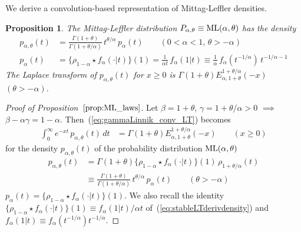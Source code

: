 \documentclass[a4paper,12pt]{article}
\newtheorem{proposition}{Proposition}
\begin{document}
{{We derive a convolution-based representation of Mittag-Leffler densities.
\begin{proposition}
\label{prop:ML_laws}
The Mittag-Leffler distribution $P_{\alpha,\theta} \equiv{\rm ML}(\alpha,\theta)$  has the   density %
\begin{align}
p_{\alpha,\theta}(t) &= \frac{\Gamma(1+\theta)}{\Gamma(1+\theta/\alpha)} \,  t^{\theta/\alpha} \, p_\alpha(t) 
\qquad (0<\alpha<1,\, \theta>-\alpha)
 \label{eq:ML2parconv_density} \\
 p_\alpha(t) &=  \{\rho_{1-\alpha}\star f_\alpha(\cdot\vert t) \}(1) = \frac{1}{\alpha t} \, f_\alpha(1\vert t)
   \equiv   \frac{1}{\alpha} \,  f_\alpha(t^{-1/\alpha}) \, t^{-1/\alpha-1}
\label{ML1parconv_density} 
\end{align}
The Laplace transform of $p_{\alpha,\theta}(t)$ for $x\ge0$  is 
$\Gamma(1+\theta)E^{1+\theta/\alpha}_{\alpha,1+\theta}(-x)$ $(\theta>-\alpha)$. 
\end{proposition}

\begin{proof}[Proof of Proposition~$\ref{prop:ML_laws}$]
\label{proof:ML_laws}
Let $\beta=1+\theta$, $\gamma=1+\theta/\alpha>0$  %
$\implies$  $\beta-\alpha\gamma=1-\alpha$.
Then~(\ref{eq:gammaLinnik_conv_LT}) becomes
\begin{align*}
\int_0^\infty e^{-x t} \, p_{\alpha,\theta}(t) \, dt 
&= \Gamma(1+\theta) E^{1+\theta/\alpha}_{\alpha,1+\theta}(-x)  \qquad (x\ge0)
\end{align*}
for the  density $p_{\alpha,\theta}(t)$ of the probability distribution ${\rm ML}(\alpha,\theta)$
\begin{align*}
p_{\alpha,\theta}(t) 
&= \Gamma(1+\theta) \{\rho_{1-\alpha} \star f_\alpha(\cdot\vert  t)\}(1) \,  \rho_{1+\theta/\alpha}(t) \\
&\equiv \frac{\Gamma(1+\theta)}{\Gamma(1+\theta/\alpha)}   \,  t^{\theta/\alpha} \, p_\alpha(t) \qquad (\theta>-\alpha)
\end{align*}
$p_\alpha(t) =  \{\rho_{1-\alpha}\star f_\alpha(\cdot\vert t) \}(1)$.  
We   also  recall  the  identity $\{\rho_{1-\alpha}\star f_\alpha(\cdot\vert  t)\}(1)\equiv f_\alpha(1\vert t)/\alpha t$  
of~(\ref{eq:stableLTderivdensity}) 
and $f_\alpha(1\vert t) \equiv f_\alpha(t^{-1/\alpha}) t^{-1/\alpha}$.
\end{proof}

}}
\end{document}
